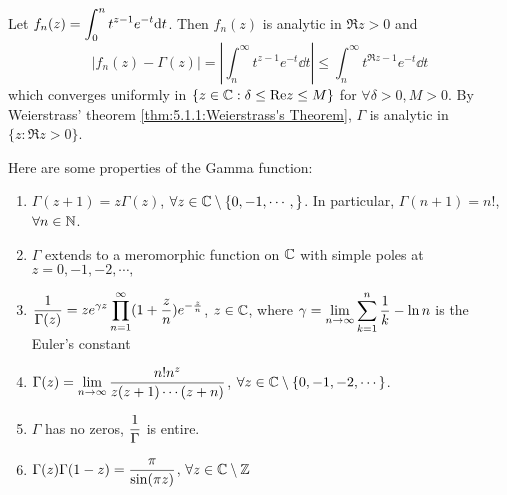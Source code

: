 Let  $ f_n(z)=\displaystyle\int_0^n t^{z-1}e^{-t}\mathrm{d} t $. Then  $ f_n(z)  $ is analytic in  $ \Re z>0 $ and 
\begin{equation}
    |f_n(z)-\Gamma(z)|=|\int_n^\infty t^{z-1}e^{-t}\dd t| \leq \int_n^\infty t^{\Re z-1}e^{-t}\dd t
\end{equation}  
which converges uniformly in  $ \{z\in \mathbb C:\delta \leq \mathrm{Re} z \leq M\} $ for  $ \forall \delta>0,M>0 $. By Weierstrass' theorem \ref{thm:5.1.1:Weierstrass's Theorem},  $ \Gamma  $  is analytic in  $ \{z:\Re z>0\} $.

\begin{proposition}\label{thm:5.2.4:properties of the Gamma function}
    Here are some properties of the Gamma function:
    \begin{enumerate}[label=(\alph*)]
        \item $ \Gamma(z+1)=z\Gamma(z) $,  $ \forall z\in \mathbb C\setminus\{0,-1,\cdots,\} $. In particular,  $ \Gamma(n+1)=n! $,  $ \forall n\in \mathbb N $.
        
        \item  $ \Gamma  $ extends to a meromorphic function on   $ \mathbb C  $ with simple poles at  $ z=0,-1,-2,\cdots, $
        
        \item  $ \displaystyle\frac{1}{\Gamma(z)}=z e^{\gamma z}\displaystyle\prod_{n=1}^\infty (1+\frac{z}{n})e^{-\frac{z}{n}} $,  $ z\in \mathbb C $, where  $ \displaystyle\gamma=\lim_{n\to\infty}\sum_{k=1}^n\frac{1}{k}-\ln n  $ is the Euler's constant 
        
        \item  $ \Gamma(z)=\displaystyle\lim_{n\to\infty}\frac{n!n^z}{z(z+1)\cdots(z+n)} $,  $ \forall z\in \mathbb C\setminus\{0,-1,-2,\cdots\} $.
        
        \item  $ \Gamma  $  has no zeros,  $ \displaystyle\frac{1}{\Gamma} $ is entire.
        
        \item  $ \Gamma(z)\Gamma(1-z)=\displaystyle\frac{\pi}{\sin(\pi z)}  $,  $ \forall z\in \mathbb C\setminus\mathbb Z $  
    \end{enumerate}
\end{proposition}

